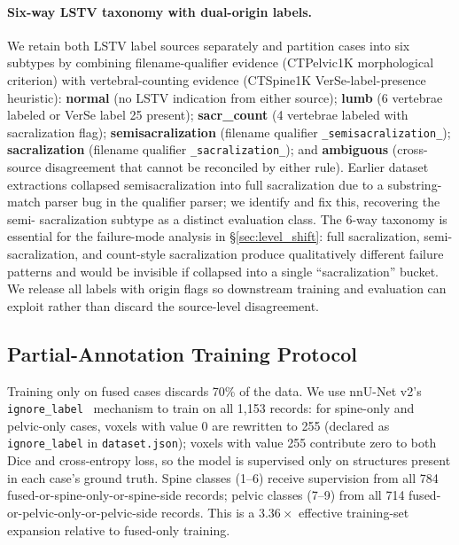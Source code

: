 \documentclass{article}
\begin{document}
\paragraph{Six-way LSTV taxonomy with dual-origin labels.}
We retain both LSTV label sources separately and partition cases
into six subtypes by combining filename-qualifier evidence
(CTPelvic1K morphological criterion) with vertebral-counting
evidence (CTSpine1K VerSe-label-presence heuristic):
\textbf{normal} (no LSTV indication from either source);
\textbf{lumb} (6 vertebrae labeled or VerSe label 25 present);
\textbf{sacr\_count} (4 vertebrae labeled with sacralization
flag);
\textbf{semisacralization} (filename qualifier
\texttt{\_semisacralization\_});
\textbf{sacralization} (filename qualifier
\texttt{\_sacralization\_}); and \textbf{ambiguous} (cross-
source disagreement that cannot be reconciled by either rule).
Earlier dataset extractions collapsed semisacralization into full
sacralization due to a substring-match parser bug in the qualifier
parser; we identify and fix this, recovering the semi-
sacralization subtype as a distinct evaluation class.
The 6-way taxonomy is essential for the failure-mode analysis in
\S\ref{sec:level_shift}: full sacralization, semi-sacralization,
and count-style sacralization produce qualitatively different
failure patterns and would be invisible if collapsed into a single
``sacralization'' bucket.
We release all labels with origin flags so downstream training
and evaluation can exploit rather than discard the source-level
disagreement.

\subsection{Partial-Annotation Training Protocol}
\label{sec:partial}

Training only on fused cases discards 70\% of the data.
We use nnU-Net v2's
\texttt{ignore\_label}~\citep{Isensee2024Nnu-netSegmentation}
mechanism to train on all 1{,}153 records:
for spine-only and pelvic-only cases, voxels with value 0 are
rewritten to 255 (declared as \texttt{ignore\_label} in
\texttt{dataset.json}); voxels with value 255 contribute zero to
both Dice and cross-entropy loss, so the model is supervised only
on structures present in each case's ground truth.
Spine classes (1--6) receive supervision from all 784
fused-or-spine-only-or-spine-side records;
pelvic classes (7--9) from all 714
fused-or-pelvic-only-or-pelvic-side records.
This is a $3.36\times$ effective training-set expansion relative
to fused-only training.
\end{document}
